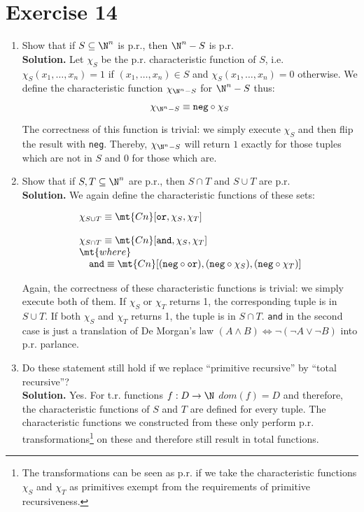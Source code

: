 \section{Exercise 14}

\begin{enumerate}
	\item Show that if $S \subseteq \N^n$ is p.r., then $\N^n - S$ is p.r.\\
	
	\textbf{Solution.} Let $\chi_S$ be the p.r. characteristic function of $S$, i.e. $\chi_S(x_1,\dots,x_n) = 1$ if $(x_1,\dots,x_n) \in S$ and $\chi_S(x_1,\dots,x_n) = 0$ otherwise. We define the characteristic function $\chi_{\N^n - S}$ for $\N^n - S$ thus:
	
	$$
		\chi_{\N^n - S} \equiv \texttt{neg} \circ \chi_S
	$$
	
	The correctness of this function is trivial: we simply execute $\chi_S$ and then flip the result with \texttt{neg}. Thereby, $\chi_{\N^n - S}$ will return $1$ exactly for those tuples which are not in $S$ and 0 for those which are.
	
	\item Show that if $S, T \subseteq \N^n$ are p.r., then $S \cap T$ and $S \cup T$ are p.r.\\
	
	\textbf{Solution.} We again define the characteristic functions of these sets:
	
	$$
		\begin{array}{l}
		\chi_{S \cup T} \equiv \mt{Cn}[\texttt{or}, \chi_S,\chi_T]\\
		\\
		\chi_{S \cap T} \equiv \mt{Cn}[\texttt{and}, \chi_S,\chi_T]\\
		\mt{where}\\
		\quad \texttt{and} \equiv \mt{Cn}[(\texttt{neg} \circ \texttt{or}), (\texttt{neg} \circ \chi_S), (\texttt{neg} \circ \chi_T)]
		\end{array}
	$$
	
	Again, the correctness of these characteristic functions is trivial: we simply execute both of them. If $\chi_S$ or $\chi_T$ returns 1, the corresponding tuple is in $S \cup T$. If both $\chi_S$ and $\chi_T$ returns 1, the tuple is in $S \cap T$. \texttt{and} in the second case is just a translation of De Morgan's law $(A \wedge B) \Leftrightarrow \neg (\neg A \vee \neg B)$ into p.r. parlance.
	
	\item Do these statement still hold if we replace ``primitive recursive'' by ``total recursive''?\\
	
	\textbf{Solution.} Yes. For t.r. functions $f : D \rightarrow \N$ $dom(f) = D$ and therefore, the characteristic functions of $S$ and $T$ are defined for every tuple. The characteristic functions we constructed from these only perform p.r. transformations\footnote{The transformations can be seen as p.r. if we take the characteristic functions $\chi_S$ and $\chi_T$ as primitives exempt from the requirements of primitive recursiveness.} on these and therefore still result in total functions.

\end{enumerate}

